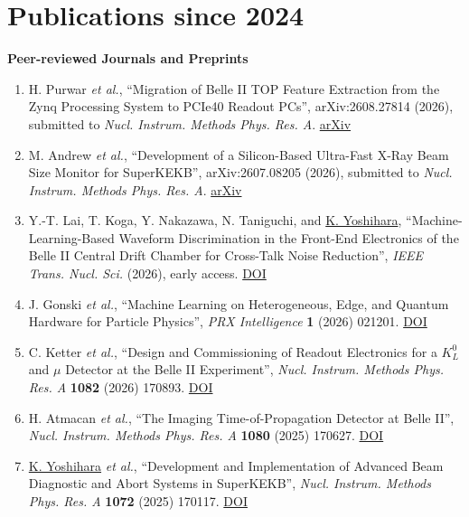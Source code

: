 \documentclass[11pt]{article}
\renewcommand{\labelenumi}{[\arabic{enumi}]}
\begin{document}
\section*{\Large{Publications since 2024}} 
{\normalsize\bfseries\color{LabOrange}Peer-reviewed Journals and Preprints}
\vspace{0.04in}
{\footnotesize
\begin{enumerate}[itemsep=0pt]
\renewcommand{\labelenumi}{[\arabic{enumi}]} 
\item{H. Purwar \textit{et al.}, ``Migration of Belle II TOP Feature Extraction from the Zynq Processing System to PCIe40 Readout PCs'', arXiv:2608.27814 (2026), submitted to \textit{Nucl. Instrum. Methods Phys. Res. A}. \href{https://arxiv.org/abs/2608.27814}{arXiv}}
\item{M. Andrew \textit{et al.}, ``Development of a Silicon-Based Ultra-Fast X-Ray Beam Size Monitor for SuperKEKB'', arXiv:2607.08205 (2026), submitted to \textit{Nucl. Instrum. Methods Phys. Res. A}. \href{https://arxiv.org/abs/2607.08205}{arXiv}}
\item{Y.-T. Lai, T. Koga, Y. Nakazawa, N. Taniguchi, and \underline{K. Yoshihara}, ``Machine-Learning-Based Waveform Discrimination in the Front-End Electronics of the Belle II Central Drift Chamber for Cross-Talk Noise Reduction'', \textit{IEEE Trans. Nucl. Sci.} (2026), early access. \href{https://doi.org/10.1109/TNS.2026.3754043}{DOI}}
\item{J. Gonski \textit{et al.}, ``Machine Learning on Heterogeneous, Edge, and Quantum Hardware for Particle Physics'', \textit{PRX Intelligence} \textbf{1} (2026) 021201. \href{https://doi.org/10.1103/bjx3-vlj8}{DOI}}
\item{C. Ketter \textit{et al.}, ``Design and Commissioning of Readout Electronics for a $K_L^0$ and $\mu$ Detector at the Belle II Experiment'', \textit{Nucl. Instrum. Methods Phys. Res. A} \textbf{1082} (2026) 170893. \href{https://doi.org/10.1016/j.nima.2025.170893}{DOI}}
\item{H. Atmacan \textit{et al.}, ``The Imaging Time-of-Propagation Detector at Belle II'', \textit{Nucl. Instrum. Methods Phys. Res. A} \textbf{1080} (2025) 170627. \href{https://doi.org/10.1016/j.nima.2025.170627}{DOI}}
\item{\underline{K. Yoshihara} \textit{et al.}, ``Development and Implementation of Advanced Beam Diagnostic and Abort Systems in SuperKEKB'', \textit{Nucl. Instrum. Methods Phys. Res. A} \textbf{1072} (2025) 170117. \href{https://doi.org/10.1016/j.nima.2024.170117}{DOI}}
\end{enumerate}

}
\end{document}
